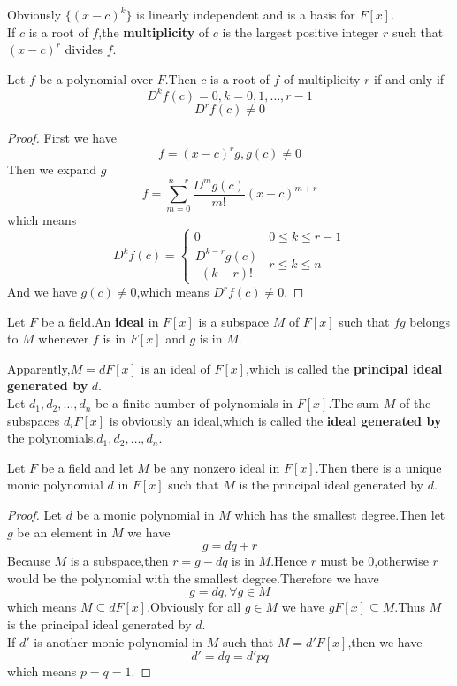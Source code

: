 \documentclass{article}
\begin{document}
Obviously $\{(x-c)^k\}$ is linearly independent and is a basis for $F[x]$.\\ 
\indent If $c$ is a root of $f$,the \textbf{multiplicity} of $c$ is the largest positive integer $r$ such that $(x-c)^r$ divides $f$.
\begin{thm}
	Let $f$ be a polynomial over $F$.Then $c$ is a root of $f$ of multiplicity $r$ if and only if
	\[D^kf(c)=0,k=0,1,\dots,r-1\]
	\[D^{r}f(c)\neq0\]  
\end{thm}
\begin{proof}
	First we have
	\[f=(x-c)^rg,g(c)\neq0\]
	Then we expand $g$
	\[f=\sum\limits_{m=0}^{n-r}\frac{D^mg(c)}{m!}(x-c)^{m+r}\]
	which means
	\[D^kf(c)=\begin{cases}
		0&0\le k\le r-1\\[8pt]
		\dfrac{D^{k-r}g(c)}{(k-r)!}&r\le k\le n
	\end{cases}\]
	And we have $g(c)\neq0$,which means $D^rf(c)\neq0$.
\end{proof}
\begin{dde}
	Let $F$ be a field.An \textbf{ideal} in $F[x]$ is a subspace $M$ of $F[x]$ such that $fg$ belongs to $M$ whenever $f$ is in $F[x]$ and $g$ is in $M$. 
\end{dde}
Apparently,$M=dF[x]$ is an ideal of $F[x]$,which is called the \textbf{principal ideal generated by} $d$.\\
\indent Let $d_1,d_2,\dots,d_n$ be a finite number of polynomials in $F[x]$.The sum $M$ of the subspaces $d_iF[x]$ is obviously an ideal,which is called the \textbf{ideal generated by} the polynomials,$d_1,d_2,\dots,d_n$.
\begin{thm}
	Let $F$ be a field and let $M$ be any nonzero ideal in $F[x]$.Then there is a unique monic polynomial $d$ in $F[x]$ such that $M$ is the principal ideal generated by $d$.
\end{thm}
\begin{proof}
	Let $d$ be a monic polynomial in $M$ which has the smallest degree.Then let $g$ be an element in $M$ we have
	\[g=dq+r\]
	Because $M$ is a subspace,then $r=g-dq$ is in $M$.Hence $r$ must be $0$,otherwise $r$ would be the polynomial with the smallest degree.Therefore we have
	\[g=dq,\forall g\in M\]
	which means $M\subseteq dF[x]$.Obviously for all $g\in M$ we have $gF[x]\subseteq M$.Thus $M$ is the principal ideal generated by $d$.\\
	If $d'$ is another monic polynomial in $M$ such that $M=d'F[x]$,then we have
	\[d'=dq=d'pq\]
	which means $p=q=1$. 
\end{proof}
\end{document}
